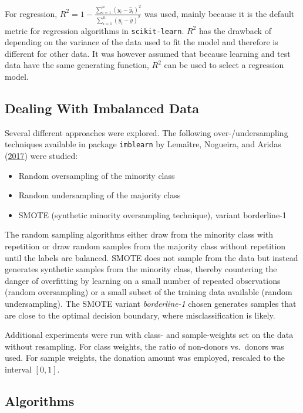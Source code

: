 \documentclass[
  11pt,
  a4paper,
  DIV=12,captions=tableheading,oneside,titlepage]{scrbook}
\providecommand{\tightlist}{%
  \setlength{\itemsep}{0pt}\setlength{\parskip}{0pt}}
\begin{document}
For regression, \(R^2 = 1- \frac{\sum_{i=1}^n(y_i-\hat{y}_i)^2}{\sum_{i=1}^n(y_i-\bar{y})^2}\) was used, mainly because it is the default metric for regression algorithms in \texttt{scikit-learn}. \(R^2\) has the drawback of depending on the variance of the data used to fit the model and therefore is different for other data. It was however assumed that because learning and test data have the same generating function, \(R^2\) can be used to select a regression model.

\hypertarget{imblearn}{%
\subsection{Dealing With Imbalanced Data}\label{imblearn}}

Several different approaches were explored. The following over-/undersampling techniques available in package \texttt{imblearn} by Lemaître, Nogueira, and Aridas (\protect\hyperlink{ref-lemaitre2017imblearn}{2017}) were studied:

\begin{itemize}
\tightlist
\item
  Random oversampling of the minority class
\item
  Random undersampling of the majority class
\item
  SMOTE (synthetic minority oversampling technique), variant borderline-1
\end{itemize}

The random sampling algorithms either draw from the minority class with repetition or draw random samples from the majority class without repetition until the labels are balanced. SMOTE does not sample from the data but instead generates synthetic samples from the minority class, thereby countering the danger of overfitting by learning on a small number of repeated observations (random oversampling) or a small subset of the training data available (random undersampling). The SMOTE variant \emph{borderline-1} chosen generates samples that are close to the optimal decision boundary, where misclassification is likely.

Additional experiments were run with class- and sample-weights set on the data without resampling. For class weights, the ratio of non-donors vs.~donors was used. For sample weights, the donation amount was employed, rescaled to the interval \([0,1]\).

\hypertarget{algorithms}{%
\subsection{Algorithms}\label{algorithms}}
\end{document}

